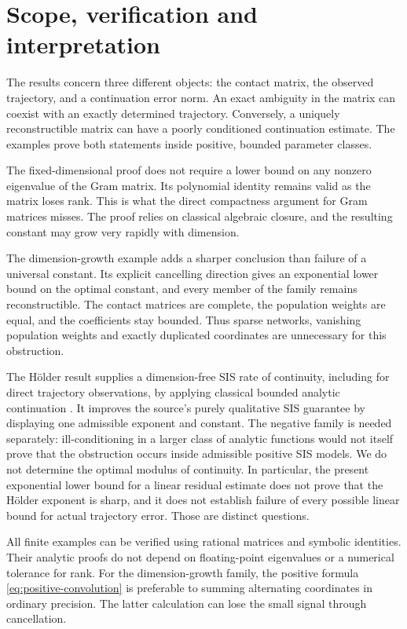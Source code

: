 \section{Scope, verification and interpretation}
\label{sec:discussion}

The results concern three different objects: the contact matrix, the observed trajectory, and a continuation error norm. An exact ambiguity in the matrix can coexist with an exactly determined trajectory. Conversely, a uniquely reconstructible matrix can have a poorly conditioned continuation estimate. The examples prove both statements inside positive, bounded parameter classes.

The fixed-dimensional proof does not require a lower bound on any nonzero eigenvalue of the Gram matrix. Its polynomial identity remains valid as the matrix loses rank. This is what the direct compactness argument for Gram matrices misses. The proof relies on classical algebraic closure, and the resulting constant may grow very rapidly with dimension.

The dimension-growth example adds a sharper conclusion than failure of a universal constant. Its explicit cancelling direction gives an exponential lower bound on the optimal constant, and every member of the family remains reconstructible. The contact matrices are complete, the population weights are equal, and the coefficients stay bounded. Thus sparse networks, vanishing population weights and exactly duplicated coordinates are unnecessary for this obstruction.

The Hölder result supplies a dimension-free SIS rate of continuity, including for direct trajectory observations, by applying classical bounded analytic continuation \cite{T2020}. It improves the source's purely qualitative SIS guarantee by displaying one admissible exponent and constant. The negative family is needed separately: ill-conditioning in a larger class of analytic functions would not itself prove that the obstruction occurs inside admissible positive SIS models. We do not determine the optimal modulus of continuity. In particular, the present exponential lower bound for a linear residual estimate does not prove that the Hölder exponent is sharp, and it does not establish failure of every possible linear bound for actual trajectory error. Those are distinct questions.

All finite examples can be verified using rational matrices and symbolic identities. Their analytic proofs do not depend on floating-point eigenvalues or a numerical tolerance for rank. For the dimension-growth family, the positive formula \eqref{eq:positive-convolution} is preferable to summing alternating coordinates in ordinary precision. The latter calculation can lose the small signal through cancellation.


